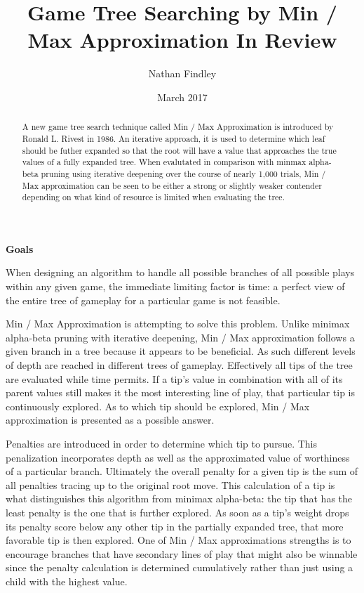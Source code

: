 \documentclass[10pt, a4paper]{article}
\title{Game Tree Searching by Min / Max Approximation In Review}
\author{Nathan Findley}
\date{March 2017}
\begin{document}
\maketitle

\begin{abstract}

A new game tree search technique called Min / Max Approximation is introduced
by Ronald L. Rivest in 1986.  An iterative approach, it is used to determine
which leaf should be futher expanded so that the root will have a value that
approaches the true values of a fully expanded tree.  When evalutated in 
comparison with minmax alpha-beta pruning
using iterative deepening over the course of nearly 1,000 trials, Min / Max
approximation can be seen to be either a strong or slightly weaker contender 
depending on what kind of resource is limited when evaluating the tree.

\end{abstract}

\textbf{Goals} 

When designing an algorithm to handle all possible branches of all possible
plays within any given game, the immediate limiting factor is time: a perfect
view of the entire tree of gameplay for a particular game is not feasible.

Min / Max Approximation is attempting to solve this problem.  Unlike minimax
alpha-beta pruning with iterative deepening, Min / Max approximation follows a
given branch in a tree because it appears to be beneficial.  As such different
levels of depth are reached in different trees of gameplay.  Effectively all
tips of the tree are evaluated while time permits.  If a tip's value in
combination with all of its parent values still makes it the most interesting
line of play, that particular tip is continuously explored. As to which tip should 
be explored, Min / Max approximation is presented as a possible answer.

Penalties are introduced in order to determine which tip to pursue. This
penalization incorporates depth as well as the approximated value of worthiness
of a particular branch.  Ultimately the overall penalty for a given tip is the
sum of all penalties tracing up to the original root move.   This calculation of
a tip is what distinguishes this algorithm from minimax alpha-beta: the tip that
has the least penalty is the one that is further explored. As soon as a tip's
weight drops its penalty score below any other tip in the partially expanded
tree, that more favorable tip is then explored. One of Min / Max approximations 
strengths is to 
encourage branches that have secondary lines of play that might also be
winnable since the penalty calculation is determined cumulatively rather than
just using a child with the highest value.
\end{document}
